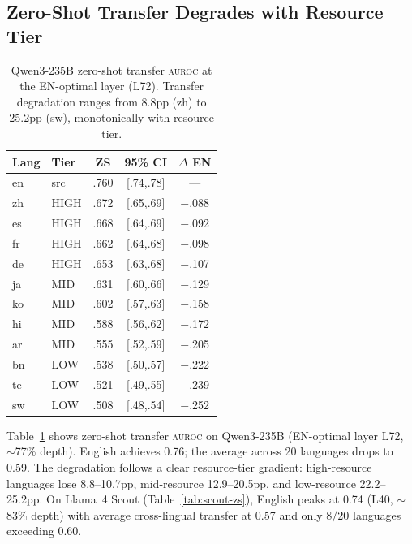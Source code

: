 \documentclass[11pt,a4paper]{article}
\newcommand{\auroc}{\textsc{auroc}}
\begin{document}
\subsection{Zero-Shot Transfer Degrades with Resource Tier}
\label{sec:zs-results}

\begin{table}[t]
\centering
\small
\begin{tabular}{llccc}
\toprule
\textbf{Lang} & \textbf{Tier} & \textbf{ZS} & \textbf{95\% CI} & \textbf{$\Delta$ EN} \\
\midrule
en & src & .760 & [.74,.78] & --- \\
zh & HIGH & .672 & [.65,.69] & $-$.088 \\
es & HIGH & .668 & [.64,.69] & $-$.092 \\
fr & HIGH & .662 & [.64,.68] & $-$.098 \\
de & HIGH & .653 & [.63,.68] & $-$.107 \\
\midrule
ja & MID & .631 & [.60,.66] & $-$.129 \\
ko & MID & .602 & [.57,.63] & $-$.158 \\
hi & MID & .588 & [.56,.62] & $-$.172 \\
ar & MID & .555 & [.52,.59] & $-$.205 \\
\midrule
bn & LOW & .538 & [.50,.57] & $-$.222 \\
te & LOW & .521 & [.49,.55] & $-$.239 \\
sw & LOW & .508 & [.48,.54] & $-$.252 \\
\bottomrule
\end{tabular}
\caption{Qwen3-235B zero-shot transfer \auroc{} at the EN-optimal layer (L72). Transfer degradation ranges from 8.8pp (zh) to 25.2pp (sw), monotonically with resource tier.}
\label{tab:qwen-zs}
\end{table}

Table~\ref{tab:qwen-zs} shows zero-shot transfer \auroc{} on Qwen3-235B (EN-optimal layer L72, $\sim$77\% depth).
English achieves 0.76; the average across 20 languages drops to 0.59.
The degradation follows a clear resource-tier gradient: high-resource languages lose 8.8--10.7pp, mid-resource 12.9--20.5pp, and low-resource 22.2--25.2pp.
On Llama~4 Scout (Table~\ref{tab:scout-zs}), English peaks at 0.74 (L40, $\sim$83\% depth) with average cross-lingual transfer at 0.57 and only 8/20 languages exceeding 0.60.
\end{document}

